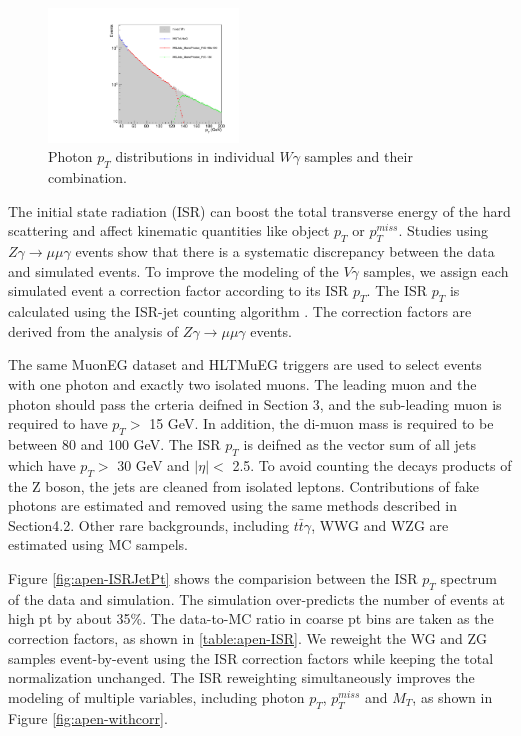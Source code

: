 \documentclass[thesis.tex]{subfiles}
\renewcommand\_{\textunderscore\allowbreak}
\begin{document}
\begin{figure}[hbtp]
  \centering
    \includegraphics[width=0.45\textwidth]{Figures/WGMixing.pdf}
  \caption{Photon $p_T$ distributions in individual $W\gamma$ samples and their combination.}
    \label{fig:mixWG}
\end{figure}

The initial state radiation (ISR) can boost the total transverse energy of the hard scattering and affect kinematic quantities like object $p_T$ or $p_T^{miss}$. Studies using $Z\gamma\rightarrow\mu\mu\gamma$ events show that there is a systematic discrepancy between the data and simulated events. To improve the modeling of the $V\gamma$ samples, we assign each simulated event a correction factor according to its ISR $p_T$. The ISR $p_T$ is calculated using the ISR-jet counting algorithm \cite{ISR-JET-ALGO}. The correction factors are derived from the analysis of $Z\gamma\rightarrow \mu\mu\gamma$ events.

The same MuonEG dataset and HLT\_MuEG triggers are used to select events with one photon and exactly two isolated muons.  The leading muon and the photon should pass the crteria deifned in Section 3, and the sub-leading muon is required to have $p_T >$ 15 GeV. In addition, the di-muon mass is required to be between 80 and 100 GeV. The ISR $p_T$ is deifned as the vector sum of all jets which have $p_T >$ 30 GeV and $|\eta| <$ 2.5.  To avoid counting the decays products of the Z boson, the jets are cleaned from isolated leptons. Contributions of fake photons are estimated and removed using the same methods described in  Section4.2.  Other rare backgrounds, including $t\bar{t}\gamma$, WWG and WZG are estimated using MC sampels.

Figure \ref{fig:apen-ISRJetPt} shows the comparision between the ISR $p_T$ spectrum of the data and simulation. The simulation over-predicts the number of events at high pt by about 35\%. The data-to-MC ratio in coarse pt bins are taken as the correction factors, as shown in \ref{table:apen-ISR}. We reweight the WG and ZG samples event-by-event using the ISR correction factors while keeping the total normalization unchanged. The ISR reweighting simultaneously improves the modeling of multiple variables, including photon $p_T$, $p_T^{miss}$ and $M_T$, as shown in Figure \ref{fig:apen-withcorr}.
\end{document}
